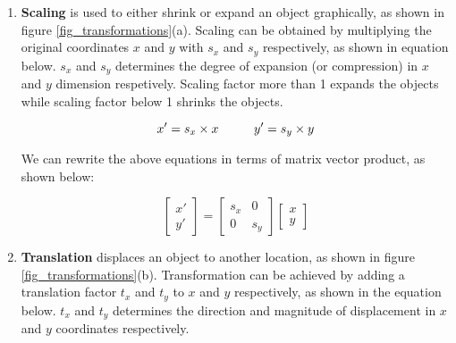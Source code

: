 \documentclass{book}
\begin{document}
                \begin{enumerate}
                    \item \textbf{Scaling} is used to either shrink or expand an object graphically, as shown in figure \ref{fig_transformations}(a).
                    Scaling can be obtained by multiplying
                    the original coordinates $x$ and $y$ with $s_{x}$ and $s_{y}$ respectively, as shown in equation below.
                    $s_{x}$ and $s_{y}$ determines the degree of expansion (or compression) in $x$ and $y$ dimension respetively. Scaling
                    factor more than 1 expands the objects while scaling factor below 1 shrinks the objects.
                    
                    \begin{equation} \label{eq_scaleNaive}
                        x' = s_{x} \times x \hspace{10mm} y' = s_{y} \times y
                    \end{equation} 

                    We can rewrite the above equations in terms of matrix vector product, as shown below: 

                    \begin{equation}
                        \begin{bmatrix}
                            x'\\ 
                            y'
                            \end{bmatrix} = \begin{bmatrix}
                            s_{x} & 0\\ 
                            0 & s_{y}
                            \end{bmatrix}
                            \begin{bmatrix}
                            x\\ 
                            y
                            \end{bmatrix}
                    \end{equation}

                    \item \textbf{Translation} displaces an object to another location, as shown in figure \ref{fig_transformations}(b).
                    Transformation can be achieved by adding a translation 
                    factor $t_{x}$ and $t_{y}$ to $x$ and $y$ respectively, as shown in the equation below. $t_{x}$ and $t_{y}$ determines the 
                    direction and magnitude of displacement in $x$ and $y$ coordinates respectively. 


\end{enumerate}
\end{document}
